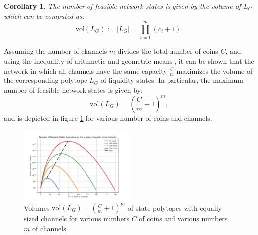 \documentclass[10pt,twocolumn]{article}
\newtheorem{corollary}{Corollary}[theorem]
\begin{document}

\begin{corollary}
The number of feasible network states is given by the volume of \( L_G \) which can be computed as:
\[ \text{vol}(L_G) := |L_G| = \prod_{i=1}^m (c_i + 1). \]
\end{corollary}

Assuming the number of channels \( m \) divides the total number of coins \( C \), and using the inequality of arithmetic and geometric means \cite{steele2004cauchy}, it can be shown that the network in which all channels have the same capacity \( \frac{C}{m} \) maximizes the volume of the corresponding polytope \( L_G \) of liquidity states. 
In particular, the maximum number of feasible network states is given by:
\[ \text{vol}(L_G) = \left( \frac{C}{m} + 1 \right)^m, \]
and is depicted in figure \ref{fig:statePolytope} for various number of coins and channels.

\begin{figure}[h]
\centering
\includegraphics[width=0.5\textwidth]{size_of_state_polytope}
\caption{Volumes \( \text{vol}(L_G) = \left( \frac{C}{m} + 1 \right)^m \) of state polytopes with equally sized channels for various numbers \( C \) of coins and various numbers \( m \) of channels.}
\label{fig:statePolytope}
\end{figure}
\end{document}
